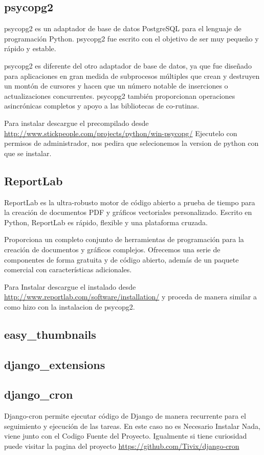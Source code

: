 \subsection{psycopg2}

psycopg2 es un adaptador de base de datos PostgreSQL para el lenguaje de
programación Python. psycopg2 fue escrito con el objetivo de ser muy pequeño
y rápido y estable. 

psycopg2 es diferente del otro adaptador de base de datos, ya que fue diseñado
para aplicaciones en gran medida de subprocesos múltiples que crean y destruyen
un montón de cursores y hacen que un número notable de inserciones o
actualizaciones concurrentes. psycopg2 también proporcionan operaciones
asincrónicas completos y apoyo a las bibliotecas de co-rutinas. 

Para instalar descargue el precompilado desde \url{http://www.stickpeople.com/projects/python/win-psycopg/}
Ejecutelo con permisos de administrador, nos pedira que selecionemos la version
de python con que se instalar.

\subsection{ReportLab}

ReportLab es la ultra-robusto motor de código abierto a prueba de tiempo para
la creación de documentos PDF y gráficos vectoriales personalizado. Escrito en
Python, ReportLab es rápido, flexible y una plataforma cruzada.
 
Proporciona un completo conjunto de herramientas de programación para la
creación de documentos y gráficos complejos. Ofrecemos una serie de componentes
 de forma gratuita y de código abierto, además de un paquete comercial con
características adicionales.

Para Instalar descargue el instalado desde \url{http://www.reportlab.com/software/installation/}
y proceda de manera similar a como hizo con la instalacion de psycopg2.


\subsection{easy\_thumbnails}


\subsection{django\_extensions}


\subsection{django\_cron}

Django-cron permite ejecutar código de Django de manera recurrente para el
seguimiento y ejecución de las tareas. En este caso no es Necesario Instalar
Nada, viene junto con el Codigo Fuente del Proyecto. Igualmente si tiene curiosidad
puede visitar la pagina del proyecto \url{https://github.com/Tivix/django-cron}




